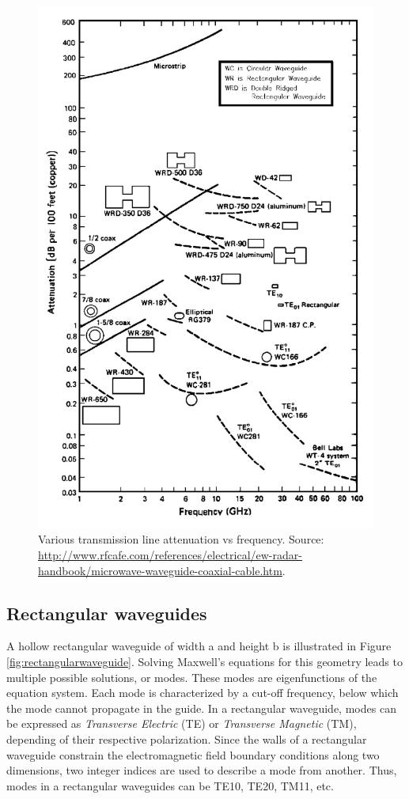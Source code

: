\begin{figure}
\centering
\includegraphics[width=0.9\linewidth]{Figures/LHCD/RFCafe_TL_attenuations}
\caption{Various transmission line attenuation vs frequency. Source: \url{http://www.rfcafe.com/references/electrical/ew-radar-handbook/microwave-waveguide-coaxial-cable.htm}.}
\label{fig:rfcafetlattenuations}
\end{figure}


\subsection{Rectangular waveguides} 
A hollow rectangular waveguide of width a and height b is illustrated in Figure \ref{fig:rectangularwaveguide}. Solving Maxwell’s equations for this geometry leads to multiple possible solutions, or modes. These modes are eigenfunctions of the equation system. Each mode is characterized by a cut-off frequency, below which the mode cannot propagate in the guide. In a rectangular waveguide, modes can be expressed as \textit{Transverse Electric} (TE) or \textit{Transverse Magnetic} (TM), depending of their respective polarization. Since the walls of a rectangular waveguide constrain the electromagnetic field boundary conditions along two dimensions, two integer indices are used to describe a mode from another. Thus, modes in a rectangular waveguides can be TE10, TE20, TM11, etc. 

